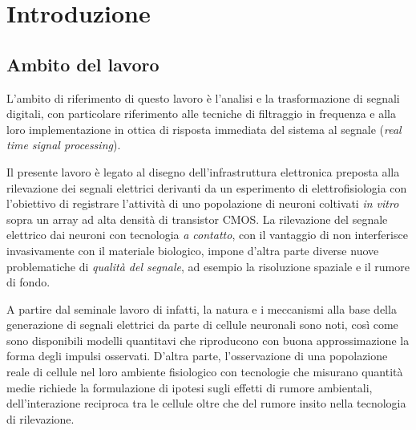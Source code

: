 



\chapter{Introduzione}
\label{cap:intro}
\graphicspath{{Pictures/}}


\section{Ambito del lavoro}
\label{sez:ambito}

L'ambito di riferimento di questo lavoro è l'analisi e la trasformazione di segnali digitali, con particolare riferimento alle tecniche di filtraggio in frequenza e alla loro implementazione in ottica di risposta immediata del sistema al segnale ({\it real time signal processing}).

Il presente lavoro è legato al disegno dell'infrastruttura elettronica preposta alla rilevazione dei segnali elettrici derivanti da un esperimento di elettrofisiologia con l'obiettivo di registrare l'attività di uno popolazione di neuroni coltivati {\it in vitro} sopra un array ad alta densità di transistor CMOS. La rilevazione del segnale elettrico dai neuroni con tecnologia {\it a contatto}, con il vantaggio di non interferisce invasivamente con il materiale biologico, impone d'altra parte diverse nuove problematiche di {\it qualità del segnale}, ad esempio la risoluzione spaziale e il rumore di fondo.

A partire dal seminale lavoro di \cite{Hodgkin1952} infatti, la natura e i meccanismi alla base della generazione di segnali elettrici da parte di cellule neuronali sono noti, così come sono disponibili modelli quantitavi che riproducono con buona approssimazione la forma degli impulsi osservati. D'altra parte, l'osservazione di una popolazione reale di cellule nel loro ambiente fisiologico con tecnologie che misurano quantità medie richiede la formulazione di ipotesi sugli effetti di rumore ambientali, dell'interazione reciproca tra le cellule oltre che del rumore insito nella tecnologia di rilevazione.

